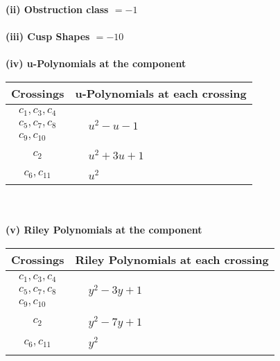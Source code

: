 \documentclass[1p]{elsarticle_modified}
\theoremstyle{definition}
\begin{document}
\flushleft \textbf{(ii) Obstruction class $= -1$}\\~\\
\flushleft \textbf{(iii) Cusp Shapes $= -10$}\\~\\
\newpage\renewcommand{\arraystretch}{1}
\flushleft \textbf{(iv) u-Polynomials at the component}\newline \\
\begin{tabular}{m{50pt}|m{274pt}}
Crossings & \hspace{64pt}u-Polynomials at each crossing \\
\hline $$\begin{aligned}c_{1},c_{3},c_{4}\\c_{5},c_{7},c_{8}\\c_{9},c_{10}\end{aligned}$$&$\begin{aligned}
&u^2- u-1
\end{aligned}$\\
\hline $$\begin{aligned}c_{2}\end{aligned}$$&$\begin{aligned}
&u^2+3 u+1
\end{aligned}$\\
\hline $$\begin{aligned}c_{6},c_{11}\end{aligned}$$&$\begin{aligned}
&u^2
\end{aligned}$\\
\hline
\end{tabular}\\~\\
\newpage\renewcommand{\arraystretch}{1}
\flushleft \textbf{(v) Riley Polynomials at the component}\newline \\
\begin{tabular}{m{50pt}|m{274pt}}
Crossings & \hspace{64pt}Riley Polynomials at each crossing \\
\hline $$\begin{aligned}c_{1},c_{3},c_{4}\\c_{5},c_{7},c_{8}\\c_{9},c_{10}\end{aligned}$$&$\begin{aligned}
&y^2-3 y+1
\end{aligned}$\\
\hline $$\begin{aligned}c_{2}\end{aligned}$$&$\begin{aligned}
&y^2-7 y+1
\end{aligned}$\\
\hline $$\begin{aligned}c_{6},c_{11}\end{aligned}$$&$\begin{aligned}
&y^2
\end{aligned}$\\
\hline
\end{tabular}\\~\\
\end{document}
